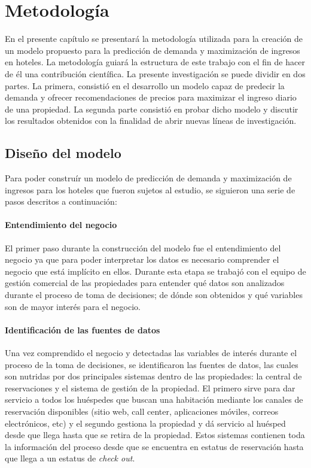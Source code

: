 \chapter{Metodología}
\label{ch:metodologia}

En el presente capítulo se presentará la metodología utilizada para la creación de un modelo propuesto para la predicción de demanda y maximización de ingresos en hoteles. La metodología guiará la estructura de este trabajo con el fin de hacer de él una contribución científica. La presente investigación se puede dividir en dos partes. La primera, consistió en el desarrollo un modelo capaz de predecir la demanda y ofrecer recomendaciones de precios para maximizar el ingreso diario de una propiedad. La segunda parte consistió en probar dicho modelo y discutir los resultados obtenidos con la finalidad de abrir nuevas líneas de investigación.

\section*{Diseño del modelo}

Para poder construír un modelo de predicción de demanda y maximización de ingresos para los hoteles que fueron sujetos al estudio, se siguieron una serie de pasos descritos a continuación:

\subsubsection*{Entendimiento del negocio}

El primer paso durante la construcción del modelo fue el entendimiento del negocio ya que para poder interpretar los datos es necesario comprender el negocio que está implícito en ellos. Durante esta etapa se trabajó con el equipo de gestión comercial de las propiedades para entender qué datos son analizados durante el proceso de toma de decisiones; de dónde son obtenidos y qué variables son de mayor interés para el negocio.

\subsubsection*{Identificación de las fuentes de datos}

Una vez comprendido el negocio y detectadas las variables de interés durante el proceso de la toma de decisiones, se identificaron las fuentes de datos, las cuales son nutridas por dos principales sistemas dentro de las propiedades: la central de reservaciones y el sistema de gestión de la propiedad. El primero sirve para dar servicio a todos los huéspedes que buscan una habitación mediante los canales de reservación disponibles (sitio web, call center, aplicaciones móviles, correos electrónicos, etc) y el segundo gestiona la propiedad y dá servicio al huésped desde que llega hasta que se retira de la propiedad. Estos sistemas contienen toda la información del proceso desde que se encuentra en estatus de reservación hasta que llega a un estatus de \emph{check out}.

